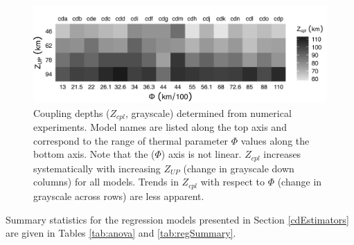 \begin{figure}[htbp]

{\centering \includegraphics[width=1\linewidth,]{assets/figs/chpt2/figA5} 

}

\caption[Coupling depths determined from numerical experiments]{Coupling depths ($Z_{cpl}$, grayscale) determined from numerical experiments. Model names are listed along the top axis and correspond to the range of thermal parameter $\Phi$ values along the bottom axis. Note that the ($\Phi$) axis is not linear. $Z_{cpl}$ increases systematically with increasing $Z_{UP}$ (change in grayscale down columns) for all models. Trends in $Z_{cpl}$ with respect to $\Phi$ (change in grayscale across rows) are less apparent.}\label{fig:results}
\end{figure}

Summary statistics for the regression models presented in Section \ref{cdEstimators} are given in Tables \ref{tab:anova} and \ref{tab:regSummary}.

